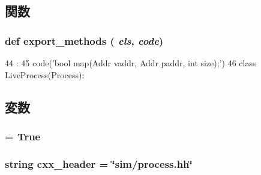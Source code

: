 \subsection{関数}
\hypertarget{classProcess_1_1Process_ab373c5eaef9a7b80491a097389260f4a}{
\subsubsection[{export\_\-methods}]{\setlength{\rightskip}{0pt plus 5cm}def export\_\-methods ( {\em cls}, \/   {\em code})}}
\label{classProcess_1_1Process_ab373c5eaef9a7b80491a097389260f4a}



\begin{DoxyCode}
44                                  :
45         code('bool map(Addr vaddr, Addr paddr, int size);')
46 
class LiveProcess(Process):
\end{DoxyCode}


\subsection{変数}
\hypertarget{classProcess_1_1Process_a17fa61ac3806b481cafee5593b55e5d0}{
\subsubsection[{abstract}]{ = True}}
\label{classProcess_1_1Process_a17fa61ac3806b481cafee5593b55e5d0}
\hypertarget{classProcess_1_1Process_a17da7064bc5c518791f0c891eff05fda}{
\subsubsection[{cxx\_\-header}]{\setlength{\rightskip}{0pt plus 5cm}string {\bf cxx\_\-header} = \char`\"{}sim/process.hh\char`\"{}}}
\label{classProcess_1_1Process_a17da7064bc5c518791f0c891eff05fda}


